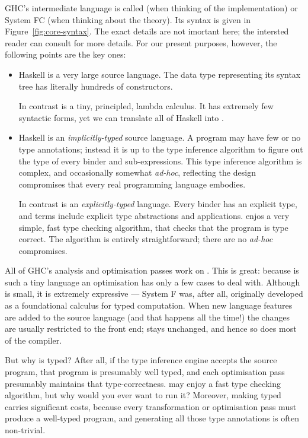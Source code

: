 \documentclass{article}
\begin{document}
GHC's intermediate language is called \Core{} (when thinking of the
implementation) or System FC (when thinking about the theory).  Its
syntax is given in Figure~\ref{fig:core-syntax}.  The exact details
are not imortant here; the intersted reader can consult
\citet{sulzmann-et-al:fc} for more details.  For our present purposes, however,
the following points are the key ones:
\begin{itemize}
\item Haskell is a very large source language.  The data type representing its syntax tree has literally hundreds of constructors. 

In contrast \Core{} is a tiny, principled, lambda calculus.  It has
extremely few syntactic forms, yet we can translate all of Haskell into \Core{}.

\item Haskell is an \emph{implicitly-typed} source language.  A program may have few or no type annotations; instead it is up to the type inference algorithm to figure out the type of every binder and sub-expressions.  This type inference algorithm is complex, and occasionally somewhat \emph{ad-hoc}, reflecting the design compromises that every real programming language embodies.

In contrast \Core{} is an \emph{explicitly-typed} language.  Every binder has an explicit type, and terms include explicit type abstractions and applications.  \Core{} enjos a very simple, fast type checking algorithm, that checks that the program is type correct.  The algorithm is entirely straightforward; there are no \emph{ad-hoc} compromises.
\end{itemize}
All of GHC's analysis and optimisation passes work on \Core{}. This is
great: because \Core{} is such a tiny language an optimisation has
only a few cases to deal with.  Although \Core{} is small, it is
extremely expressive --- System F was, after all, originally developed
as a foundational calculus for typed computation.
When new language features
are added to the source language (and that happens all the time!) the
changes are usually restricted to the front end; \Core{} stays
unchanged, and hence so does most of the compiler.

But why is \Core{} typed?  After all, if the type inference engine
accepts the source program, that program is presumably well typed, and
each optimisation pass presumably maintains that type-correctness.
\Core{} may enjoy a fast type checking algorithm, but why
would you ever want to run it?  Moreover, making \Core{} typed carries
significant costs, because every transformation or optimisation pass
must produce a well-typed program, and generating all those type
annotations is often non-trivial.
\end{document}
